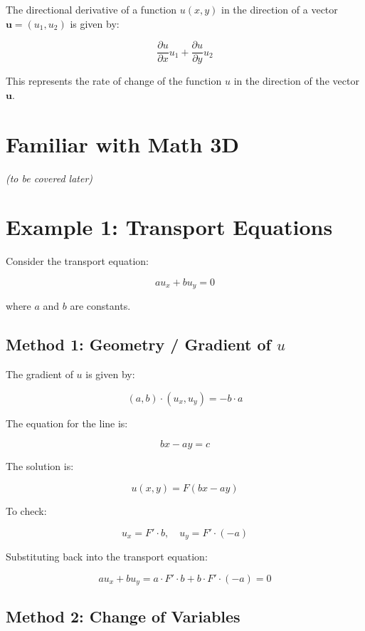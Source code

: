 \documentclass[11pt]{article}
\begin{document}
The directional derivative of a function \( u(x, y) \) in the direction of a vector \(\mathbf{u} = (u_1, u_2)\) is given by:

\[
\frac{\partial u}{\partial x} u_1 + \frac{\partial u}{\partial y} u_2
\]

This represents the rate of change of the function \( u \) in the direction of the vector \(\mathbf{u}\).

\section*{Familiar with Math 3D}

\emph{(to be covered later)}





\section*{Example 1: Transport Equations}

Consider the transport equation:

\begin{equation}
    a u_x + b u_y = 0
\end{equation}

where \(a\) and \(b\) are constants.

\subsection*{Method 1: Geometry / Gradient of \(u\)}

The gradient of \(u\) is given by:

\[
(a, b) \cdot (u_x, u_y) = -b \cdot a
\]

The equation for the line is:

\begin{equation}
    bx - ay = c
\end{equation}

The solution is:

\[
u(x, y) = F(bx - ay)
\]

To check:

\[
u_x = F' \cdot b, \quad u_y = F' \cdot (-a)
\]

Substituting back into the transport equation:

\[
a u_x + b u_y = a \cdot F' \cdot b + b \cdot F' \cdot (-a) = 0
\]

\subsection*{Method 2: Change of Variables}
\end{document}
